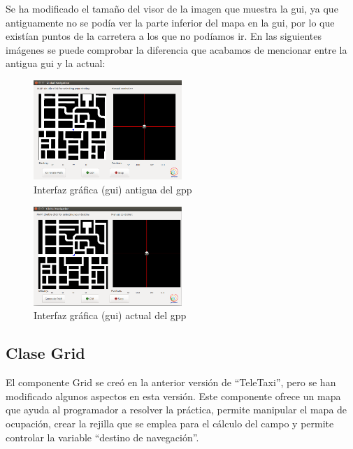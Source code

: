 Se ha modificado el tamaño del visor de la imagen que muestra la \acrshort{gui}, ya que antiguamente no se podía ver la parte inferior del mapa en la \acrshort{gui}, por lo que existían puntos de la carretera a los que no podíamos ir. En las siguientes imágenes se puede comprobar la diferencia que acabamos de mencionar entre la antigua \acrshort{gui} y la actual:
\begin{figure}[H]
  \begin{center}
    \includegraphics[width=0.5\textwidth]{figures/GPP/GUI_mal.png}
		\caption{Interfaz gráfica (\acrshort{gui}) antigua del \acrshort{gpp}}
		\label{fig.gui_mal}
		\end{center}
\end{figure}

\begin{figure}[H]
  \begin{center}
    \includegraphics[width=0.5\textwidth]{figures/GPP/GUI_correcta.png}
		\caption{Interfaz gráfica (\acrshort{gui}) actual del \acrshort{gpp}}
		\label{fig.gui_correcta}
		\end{center}
\end{figure}

\subsection{Clase Grid}
El componente Grid se creó en la anterior versión de ``TeleTaxi'', pero se han modificado algunos aspectos en esta versión. Este componente ofrece un mapa que ayuda al programador a resolver la práctica, permite manipular el mapa de ocupación, crear la rejilla que se emplea para el cálculo del campo y permite controlar la variable ``destino de navegación''.\\

